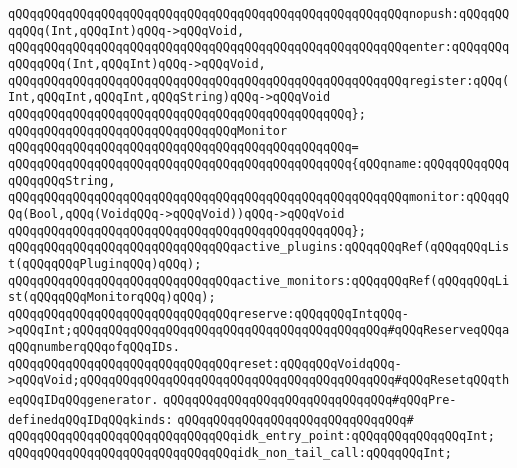\verb|qQQqqQQqqQQqqQQqqQQqqQQqqQQqqQQqqQQqqQQqqQQqqQQqqQQqqQQqnopush:qQQqqQQqqQQq(Int,qQQqInt)qQQq->qQQqVoid,|\newline
\verb|qQQqqQQqqQQqqQQqqQQqqQQqqQQqqQQqqQQqqQQqqQQqqQQqqQQqqQQqenter:qQQqqQQqqQQqqQQq(Int,qQQqInt)qQQq->qQQqVoid,|\newline
\verb|qQQqqQQqqQQqqQQqqQQqqQQqqQQqqQQqqQQqqQQqqQQqqQQqqQQqqQQqregister:qQQq(Int,qQQqInt,qQQqInt,qQQqString)qQQq->qQQqVoid|\newline
\verb|qQQqqQQqqQQqqQQqqQQqqQQqqQQqqQQqqQQqqQQqqQQqqQQq};|\newline
\newline
\verb|qQQqqQQqqQQqqQQqqQQqqQQqqQQqqQQqMonitor|\newline
\verb|qQQqqQQqqQQqqQQqqQQqqQQqqQQqqQQqqQQqqQQqqQQqqQQq=|\newline
\verb|qQQqqQQqqQQqqQQqqQQqqQQqqQQqqQQqqQQqqQQqqQQqqQQq{qQQqname:qQQqqQQqqQQqqQQqqQQqString,|\newline
\verb|qQQqqQQqqQQqqQQqqQQqqQQqqQQqqQQqqQQqqQQqqQQqqQQqqQQqqQQqmonitor:qQQqqQQq(Bool,qQQq(VoidqQQq->qQQqVoid))qQQq->qQQqVoid|\newline
\verb|qQQqqQQqqQQqqQQqqQQqqQQqqQQqqQQqqQQqqQQqqQQqqQQq};|\newline
\newline
\verb|qQQqqQQqqQQqqQQqqQQqqQQqqQQqqQQqactive_plugins:qQQqqQQqRef(qQQqqQQqList(qQQqqQQqPluginqQQq)qQQq);|\newline
\verb|qQQqqQQqqQQqqQQqqQQqqQQqqQQqqQQqactive_monitors:qQQqqQQqRef(qQQqqQQqList(qQQqqQQqMonitorqQQq)qQQq);|\newline
\newline
\verb|qQQqqQQqqQQqqQQqqQQqqQQqqQQqqQQqreserve:qQQqqQQqIntqQQq->qQQqInt;qQQqqQQqqQQqqQQqqQQqqQQqqQQqqQQqqQQqqQQqqQQq#qQQqReserveqQQqaqQQqnumberqQQqofqQQqIDs.|\newline
\newline
\verb|qQQqqQQqqQQqqQQqqQQqqQQqqQQqqQQqreset:qQQqqQQqVoidqQQq->qQQqVoid;qQQqqQQqqQQqqQQqqQQqqQQqqQQqqQQqqQQqqQQqqQQq#qQQqResetqQQqtheqQQqIDqQQqgenerator.|\newline
\newline
\verb|qQQqqQQqqQQqqQQqqQQqqQQqqQQqqQQq#qQQqPre-definedqQQqIDqQQqkinds:|\newline
\verb|qQQqqQQqqQQqqQQqqQQqqQQqqQQqqQQq#|\newline
\verb|qQQqqQQqqQQqqQQqqQQqqQQqqQQqqQQqidk_entry_point:qQQqqQQqqQQqqQQqInt;|\newline
\verb|qQQqqQQqqQQqqQQqqQQqqQQqqQQqqQQqidk_non_tail_call:qQQqqQQqInt;|\newline
